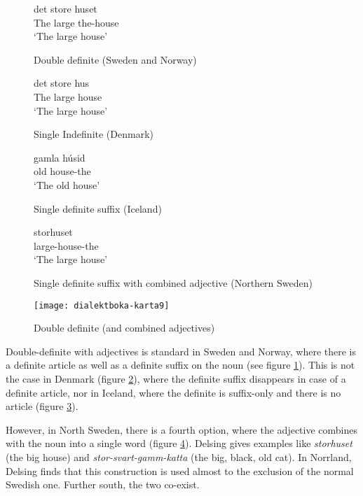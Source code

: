 \begin{figure}
 \gll det store huset \\
  The large the-house \\
  \trans `The large house'
  \caption{Double definite (Sweden and Norway)}
  \label{double-definite-example}
\end{figure}
\begin{figure}
 \gll det store hus \\
  The large house\\
  \trans `The large house'
  \caption{Single Indefinite (Denmark)}
  \label{single-definite-example}
\end{figure}
\begin{figure}
  \gll gamla h\'usid \\
  old house-the \\
  \trans `The old house'
  \caption{Single definite suffix (Iceland)}
  \label{single-definite-suffix-example}
\end{figure}
\begin{figure}
 \gll storhuset \\
  large-house-the \\
  \trans `The large house'
  \caption{Single definite suffix with combined adjective (Northern Sweden)}
  \label{adjective-single-definite-suffix-example}
\end{figure}

\begin{figure}
  \texttt{[image: dialektboka-karta9]}
  \caption{Double definite (and combined adjectives)}
  \label{double-definite-map}
\end{figure}

Double-definite with adjectives is standard in Sweden and Norway,
where there is a definite article as well as a definite suffix on the
noun (see figure \ref{double-definite-example}). This is not the case
in Denmark (figure \ref{single-definite-example}), where the definite
suffix disappears in case of a definite article, nor in Iceland, where
the definite is suffix-only and there is no article (figure
\ref{single-definite-suffix-example}).

However, in North Sweden, there is a fourth option, where the
adjective combines with the noun into a single word (figure
\ref{adjective-single-definite-suffix-example}). Delsing gives
examples like {\it storhuset} (the big house) and {\it
  stor-svart-gamm-katta} (the big, black, old cat). In Norrland,
Delsing finds that this construction is used almost to the exclusion
of the normal Swedish one. Further south, the two co-exist.


